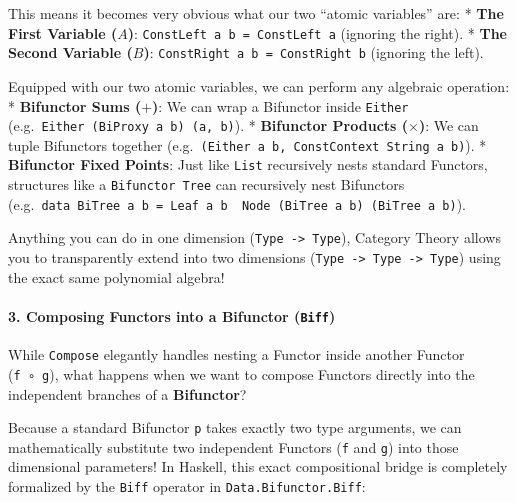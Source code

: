 \documentclass[
]{article}
\begin{document}
This means it becomes very obvious what our two ``atomic variables''
are: * \textbf{The First Variable (\(A\))}:
\texttt{ConstLeft\ a\ b\ =\ ConstLeft\ a} (ignoring the right). *
\textbf{The Second Variable (\(B\))}:
\texttt{ConstRight\ a\ b\ =\ ConstRight\ b} (ignoring the left).

Equipped with our two atomic variables, we can perform any algebraic
operation: * \textbf{Bifunctor Sums (\(+\))}: We can wrap a Bifunctor
inside \texttt{Either} (e.g.~\texttt{Either\ (BiProxy\ a\ b)\ (a,\ b)}).
* \textbf{Bifunctor Products (\(\times\))}: We can tuple Bifunctors
together (e.g.~\texttt{(Either\ a\ b,\ ConstContext\ String\ a\ b)}). *
\textbf{Bifunctor Fixed Points}: Just like \texttt{List} recursively
nests standard Functors, structures like a \texttt{Bifunctor\ Tree} can
recursively nest Bifunctors
(e.g.~\texttt{data\ BiTree\ a\ b\ =\ Leaf\ a\ b\ \textbar{}\ Node\ (BiTree\ a\ b)\ (BiTree\ a\ b)}).

Anything you can do in one dimension
(\texttt{Type\ -\textgreater{}\ Type}), Category Theory allows you to
transparently extend into two dimensions
(\texttt{Type\ -\textgreater{}\ Type\ -\textgreater{}\ Type}) using the
exact same polynomial algebra!

\paragraph{\texorpdfstring{3. Composing Functors into a Bifunctor
(\texttt{Biff})}{3. Composing Functors into a Bifunctor (Biff)}}\label{composing-functors-into-a-bifunctor-biff}

While \texttt{Compose} elegantly handles nesting a Functor inside
another Functor (\texttt{f\ ∘\ g}), what happens when we want to compose
Functors directly into the independent branches of a \textbf{Bifunctor}?

Because a standard Bifunctor \texttt{p} takes exactly two type
arguments, we can mathematically substitute two independent Functors
(\texttt{f} and \texttt{g}) into those dimensional parameters! In
Haskell, this exact compositional bridge is completely formalized by the
\texttt{Biff} operator in \texttt{Data.Bifunctor.Biff}:
\end{document}

